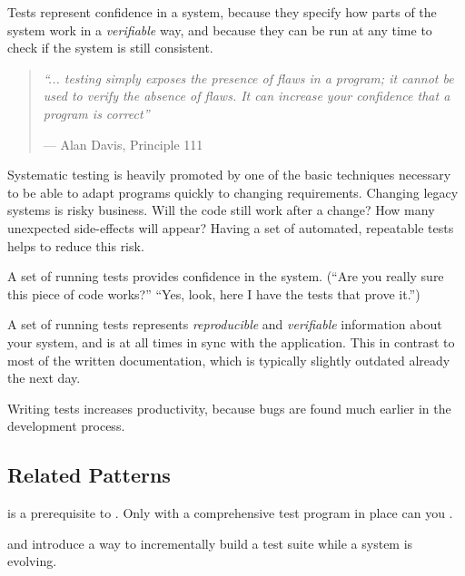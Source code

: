 \documentclass[a4paper,10pt,twoside]{book}
\begin{document}
\noindent
Tests represent confidence in a system, because they specify how parts of the system work in a \emph{verifiable} way, and because they can be run at any time to check if the system is still consistent. 

\begin{quotation}
\noindent
\emph{``... testing simply exposes the presence of flaws in a program; it cannot be used to verify the absence of flaws. It can increase your confidence that a program is correct''}

\hfill --- Alan Davis, Principle 111 \cite{Davi95a}
\end{quotation}

Systematic testing is heavily promoted by  \cite{Beck00a} one of the basic techniques necessary to be able to adapt programs quickly to changing requirements. Changing legacy systems is risky business. Will the code still work after a change? How many unexpected side-effects will appear? Having a set of automated, repeatable tests helps to reduce this risk. 

\begin{bulletlist}
\item A set of running tests provides confidence in the system. (``Are you really sure this piece of code works?'' ``Yes, look, here I have the tests that prove it.'')
\item A set of running tests represents \emph{reproducible} and \emph{verifiable} information about your system, and is at all times in sync with the application. This in contrast to most of the written documentation, which is typically slightly outdated already the next day.
\item Writing tests increases productivity, because bugs are found much earlier in the development process.
\end{bulletlist}

\subsection*{Related Patterns}

 is a prerequisite to . Only with a comprehensive test program in place can you . 

 and  introduce a way to incrementally build a test suite while a system is evolving. 
\end{document}
